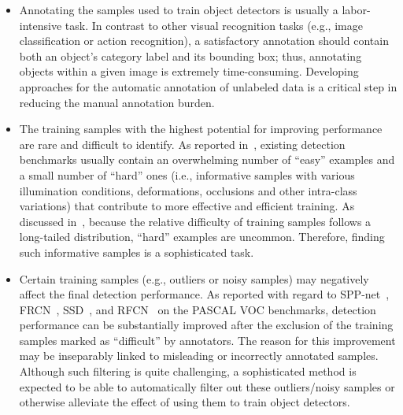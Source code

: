 \documentclass[journal]{IEEEtran}
\begin{document}
\begin{itemize}
\item  Annotating the samples used to train object detectors is usually a labor-intensive task. In contrast to other visual recognition tasks (e.g., image classification or action recognition), {a satisfactory annotation should contain} both an object's category label and its bounding box; thus, {annotating objects within a given image} is extremely time-consuming. Developing approaches for the automatic annotation of unlabeled data is a critical step in reducing the manual annotation burden. 
\item The training samples with the highest potential for improving performance are rare and difficult to identify. As reported in~\cite{ohem2016cvpr}, existing detection benchmarks usually contain an overwhelming number of ``easy'' examples and a small number of ``hard'' ones (i.e., informative samples with various {illumination conditions}, deformations, occlusions and other intra-class variations) that contribute to more effective and efficient training. As discussed in~\cite{Wang_2017_CVPR}, because {the relative difficulty of training samples follows} a long-tailed distribution, ``hard'' examples are uncommon. Therefore, finding such informative samples is a sophisticated task.
\item {Certain} training samples (e.g., outliers or noisy samples) may negatively affect the final detection performance. As reported {with regard to} SPP-net~\cite{spp15PAMI}, FRCN~\cite{frcn}, SSD~\cite{ssd16ECCV}, and RFCN~\cite{rfcn16NIPS} {on the PASCAL VOC benchmarks, detection performance can be substantially improved after the exclusion of the training samples marked as ``difficult'' by annotators}. The reason {for this improvement} may be inseparably linked to misleading or incorrectly annotated samples. {Although} such filtering is quite challenging, a sophisticated method is expected to be able to automatically filter out these outliers/noisy samples or otherwise alleviate the effect of using them to train object detectors.
\end{itemize}
\end{document}
